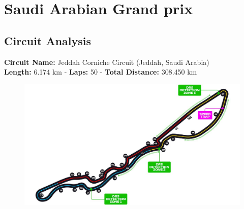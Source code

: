 \section{Saudi Arabian Grand prix}

\subsection{Circuit Analysis}

\textbf{Circuit Name:} Jeddah Corniche Circuit (Jeddah, Saudi Arabia) \\
\textbf{Length:} 6.174 km - \textbf{Laps:} 50 - \textbf{Total Distance:} 308.450 km

\begin{figure}[H]
    \centering
    \includegraphics[width=0.75\linewidth]{images/2.Jeddah_Circuit.jpg}
\end{figure}

